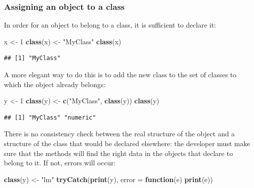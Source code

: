 \documentclass[
  12pt,
  american,
  a4paper,
  extrafontsizes,onecolumn,openright
  ]{memoir}
\newenvironment{Shaded}{\begin{snugshade}}{\end{snugshade}}
\newcommand{\AttributeTok}[1]{\textcolor[rgb]{0.13,0.29,0.53}{#1}}
\newcommand{\ControlFlowTok}[1]{\textcolor[rgb]{0.13,0.29,0.53}{\textbf{#1}}}
\newcommand{\DecValTok}[1]{\textcolor[rgb]{0.00,0.00,0.81}{#1}}
\newcommand{\FunctionTok}[1]{\textcolor[rgb]{0.13,0.29,0.53}{\textbf{#1}}}
\newcommand{\NormalTok}[1]{#1}
\newcommand{\OtherTok}[1]{\textcolor[rgb]{0.56,0.35,0.01}{#1}}
\newcommand{\StringTok}[1]{\textcolor[rgb]{0.31,0.60,0.02}{#1}}
\begin{document}
\subsubsection{Assigning an object to a class}\label{assigning-an-object-to-a-class}

In order for an object to belong to a class, it is sufficient to declare it:

\scriptsize

\begin{Shaded}
\begin{Highlighting}[]
\NormalTok{x }\OtherTok{\textless{}{-}} \DecValTok{1}
\FunctionTok{class}\NormalTok{(x) }\OtherTok{\textless{}{-}} \StringTok{"MyClass"}
\FunctionTok{class}\NormalTok{(x)}
\end{Highlighting}
\end{Shaded}

\begin{verbatim}
## [1] "MyClass"
\end{verbatim}

\normalsize

A more elegant way to do this is to add the new class to the set of classes to which the object already belongs:

\scriptsize

\begin{Shaded}
\begin{Highlighting}[]
\NormalTok{y }\OtherTok{\textless{}{-}} \DecValTok{1}
\FunctionTok{class}\NormalTok{(y) }\OtherTok{\textless{}{-}} \FunctionTok{c}\NormalTok{(}\StringTok{"MyClass"}\NormalTok{, }\FunctionTok{class}\NormalTok{(y))}
\FunctionTok{class}\NormalTok{(y)}
\end{Highlighting}
\end{Shaded}

\begin{verbatim}
## [1] "MyClass" "numeric"
\end{verbatim}

\normalsize

There is no consistency check between the real structure of the object and a structure of the class that would be declared elsewhere: the developer must make sure that the methods will find the right data in the objects that declare to belong to it.
If not, errors will occur:

\scriptsize

\begin{Shaded}
\begin{Highlighting}[]
\FunctionTok{class}\NormalTok{(y) }\OtherTok{\textless{}{-}} \StringTok{"lm"}
\FunctionTok{tryCatch}\NormalTok{(}\FunctionTok{print}\NormalTok{(y), }\AttributeTok{error =} \ControlFlowTok{function}\NormalTok{(e) }\FunctionTok{print}\NormalTok{(e))}
\end{Highlighting}
\end{Shaded}
\end{document}
